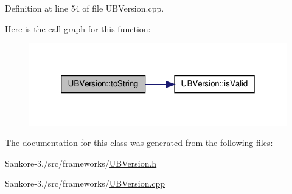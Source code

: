 Definition at line 54 of file U\-B\-Version.\-cpp.



Here is the call graph for this function\-:
\nopagebreak
\begin{figure}[H]
\begin{center}
\leavevmode
\includegraphics[width=320pt]{d2/da9/class_u_b_version_a7dc5d2b5857cb37713d04705a948e41c_cgraph}
\end{center}
\end{figure}




The documentation for this class was generated from the following files\-:\begin{DoxyCompactItemize}
\item 
Sankore-\/3./src/frameworks/\hyperlink{_u_b_version_8h}{U\-B\-Version.\-h}\item 
Sankore-\/3./src/frameworks/\hyperlink{_u_b_version_8cpp}{U\-B\-Version.\-cpp}\end{DoxyCompactItemize}
